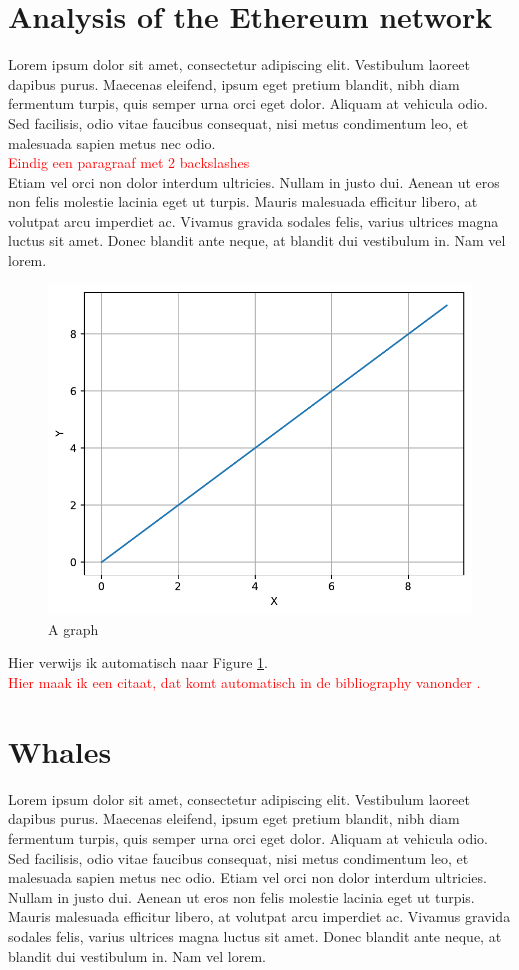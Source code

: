 \documentclass[10pt,a4paper]{article}
\newcommand{\todo}[1]{\textcolor{red}{#1}}
\begin{document}
\begin{multicols}{2}
\section{Analysis of the Ethereum network}
Lorem ipsum dolor sit amet, consectetur adipiscing elit. Vestibulum laoreet dapibus purus. Maecenas eleifend, ipsum eget pretium blandit, nibh diam fermentum turpis, quis semper urna orci eget dolor. Aliquam at vehicula odio. Sed facilisis, odio vitae faucibus consequat, nisi metus condimentum leo, et malesuada sapien metus nec odio. \\
\todo{Eindig een paragraaf met 2 backslashes\\}
Etiam vel orci non dolor interdum ultricies. Nullam in justo dui. Aenean ut eros non felis molestie lacinia eget ut turpis. Mauris malesuada efficitur libero, at volutpat arcu imperdiet ac. Vivamus gravida sodales felis, varius ultrices magna luctus sit amet. Donec blandit ante neque, at blandit dui vestibulum in. Nam vel lorem.
	
\begin{figure}[H]
\centering
\includegraphics[scale=0.44]{figures/graph.pdf}
\caption{A graph}
\label{fig-agraph}
\end{figure}

Hier verwijs ik automatisch naar Figure \ref{fig-agraph}. \\
\todo{Hier maak ik een citaat, dat komt automatisch in de bibliography vanonder \cite{Becchetti06acomparison}.}
\section{Whales}
	Lorem ipsum dolor sit amet, consectetur adipiscing elit. Vestibulum laoreet dapibus purus. Maecenas eleifend, ipsum eget pretium blandit, nibh diam fermentum turpis, quis semper urna orci eget dolor. Aliquam at vehicula odio. Sed facilisis, odio vitae faucibus consequat, nisi metus condimentum leo, et malesuada sapien metus nec odio. Etiam vel orci non dolor interdum ultricies. Nullam in justo dui. Aenean ut eros non felis molestie lacinia eget ut turpis. Mauris malesuada efficitur libero, at volutpat arcu imperdiet ac. Vivamus gravida sodales felis, varius ultrices magna luctus sit amet. Donec blandit ante neque, at blandit dui vestibulum in. Nam vel lorem.


\end{multicols}


\end{document}
